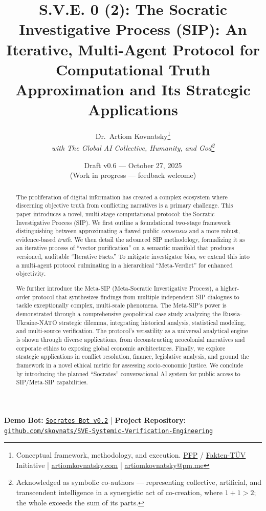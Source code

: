 \documentclass[11pt,a4paper]{article}
\title{\textbf{S.V.E. 0 (2): The Socratic Investigative Process (SIP): An Iterative, Multi-Agent Protocol for Computational Truth Approximation and Its Strategic Applications}}
\author{
  Dr.\ Artiom Kovnatsky\thanks{Conceptual framework, methodology, and execution. 
  \href{http://www.pfp24.de}{PFP} / 
  \href{http://www.fakten-tuev.de}{Fakten-TÜV} Initiative \;|\;
  \href{https://www.artiomkovnatsky.com/}{artiomkovnatsky.com} \;|\;
  \href{mailto:artiomkovnatsky@pm.me}{artiomkovnatsky@pm.me}}\\
  \textit{with The Global AI Collective, Humanity, and God\footnote{Acknowledged as symbolic co-authors — representing collective, artificial, and transcendent intelligence in a synergistic act of co-creation, where $1 + 1 > 2$; the whole exceeds the sum of its parts.}}
}
\date{Draft v0.6 — October 27, 2025\\
\small (Work in progress — feedback welcome)}
\begin{document}
\maketitle
\vspace{-1em}
\begin{center}
    {\small 
    \textbf{Demo Bot:} 
    \href{https://chatgpt.com/g/g-68f1fc9848948191a1cc038db8e3422b-sokrat-socrates-bot-v0-2}
    {\texttt{Socrates Bot v0.2}} 
    \quad|\quad
    \textbf{Project Repository:} 
    \href{https://codeberg.org/skovnats/SVE-Systemic-Verification-Engineering}
    {\texttt{github.com/skovnats/SVE-Systemic-Verification-Engineering}}}
\end{center}
\vspace{1em}
\thispagestyle{empty}


\begin{abstract}
\noindent The proliferation of digital information has created a complex ecosystem where discerning objective truth from conflicting narratives is a primary challenge. This paper introduces a novel, multi-stage computational protocol: the Socratic Investigative Process (SIP). We first outline a foundational two-stage framework distinguishing between approximating a flawed public \textit{consensus} and a more robust, evidence-based \textit{truth}. We then detail the advanced SIP methodology, formalizing it as an iterative process of ``vector purification'' on a semantic manifold that produces versioned, auditable ``Iterative Facts.'' To mitigate investigator bias, we extend this into a multi-agent protocol culminating in a hierarchical ``Meta-Verdict'' for enhanced objectivity. 

We further introduce the Meta-SIP (Meta-Socratic Investigative Process), a higher-order protocol that synthesizes findings from multiple independent SIP dialogues to tackle exceptionally complex, multi-scale phenomena. The Meta-SIP's power is demonstrated through a comprehensive geopolitical case study analyzing the Russia-Ukraine-NATO strategic dilemma, integrating historical analysis, statistical modeling, and multi-source verification. The protocol's versatility as a universal analytical engine is shown through diverse applications, from deconstructing neocolonial narratives and corporate ethics to exposing global economic architectures. Finally, we explore strategic applications in conflict resolution, finance, legislative analysis, and ground the framework in a novel ethical metric for assessing socio-economic justice. We conclude by introducing the planned ``Socrates'' conversational AI system for public access to SIP/Meta-SIP capabilities.
\end{abstract}
\end{document}
